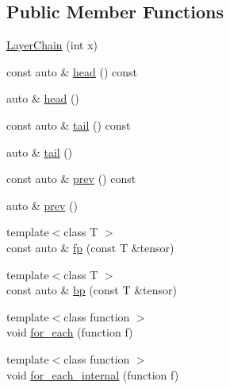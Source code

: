 \subsection*{Public Member Functions}
\begin{DoxyCompactItemize}
\item 
\hyperlink{structBC_1_1NN_1_1LayerChain_3_01index_00_01derived_00_01output__layer__t_01_4_ab7ec3d4c2001314d19342c80ca0f68d9}{Layer\+Chain} (int x)
\item 
const auto \& \hyperlink{structBC_1_1NN_1_1LayerChain_3_01index_00_01derived_00_01output__layer__t_01_4_a4f4f795e2105c5ed4e03c9a7bcf6ca2d}{head} () const 
\item 
auto \& \hyperlink{structBC_1_1NN_1_1LayerChain_3_01index_00_01derived_00_01output__layer__t_01_4_af2324126ffc5cf7794c95f578bb904d6}{head} ()
\item 
const auto \& \hyperlink{structBC_1_1NN_1_1LayerChain_3_01index_00_01derived_00_01output__layer__t_01_4_a14bcb45b3767eee0d99e5e0ab7673087}{tail} () const 
\item 
auto \& \hyperlink{structBC_1_1NN_1_1LayerChain_3_01index_00_01derived_00_01output__layer__t_01_4_a818f65e732e5c36a2fa3a4d89eb11d72}{tail} ()
\item 
const auto \& \hyperlink{structBC_1_1NN_1_1LayerChain_3_01index_00_01derived_00_01output__layer__t_01_4_a97f689d78002e66a4ac3b908593b1008}{prev} () const 
\item 
auto \& \hyperlink{structBC_1_1NN_1_1LayerChain_3_01index_00_01derived_00_01output__layer__t_01_4_a8d15e29f4a8e4c8747a51bdeb2ee592c}{prev} ()
\item 
{\footnotesize template$<$class T $>$ }\\const auto \& \hyperlink{structBC_1_1NN_1_1LayerChain_3_01index_00_01derived_00_01output__layer__t_01_4_ae99175e8fb4fa786da6e95c36d353947}{fp} (const T \&tensor)
\item 
{\footnotesize template$<$class T $>$ }\\const auto \& \hyperlink{structBC_1_1NN_1_1LayerChain_3_01index_00_01derived_00_01output__layer__t_01_4_a5e29d8715b69b4bb2352cb4c24422414}{bp} (const T \&tensor)
\item 
{\footnotesize template$<$class function $>$ }\\void \hyperlink{structBC_1_1NN_1_1LayerChain_3_01index_00_01derived_00_01output__layer__t_01_4_a8b640c13d42c7e624e39d362420c6825}{for\+\_\+each} (function f)
\item 
{\footnotesize template$<$class function $>$ }\\void \hyperlink{structBC_1_1NN_1_1LayerChain_3_01index_00_01derived_00_01output__layer__t_01_4_a2cc74e54b4c2f63843b4f0ef428f410c}{for\+\_\+each\+\_\+internal} (function f)
\end{DoxyCompactItemize}
